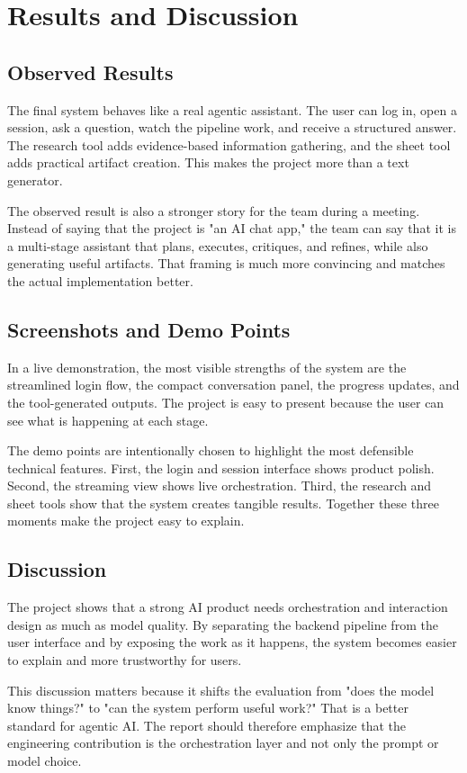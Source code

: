 \documentclass[11pt,oneside]{report}
\begin{document}
\chapter{Results and Discussion}
\section{Observed Results}
The final system behaves like a real agentic assistant. The user can log in, open a session, ask a question, watch the pipeline work, and receive a structured answer. The research tool adds evidence-based information gathering, and the sheet tool adds practical artifact creation. This makes the project more than a text generator.

The observed result is also a stronger story for the team during a meeting. Instead of saying that the project is "an AI chat app," the team can say that it is a multi-stage assistant that plans, executes, critiques, and refines, while also generating useful artifacts. That framing is much more convincing and matches the actual implementation better.

\section{Screenshots and Demo Points}
In a live demonstration, the most visible strengths of the system are the streamlined login flow, the compact conversation panel, the progress updates, and the tool-generated outputs. The project is easy to present because the user can see what is happening at each stage.

The demo points are intentionally chosen to highlight the most defensible technical features. First, the login and session interface shows product polish. Second, the streaming view shows live orchestration. Third, the research and sheet tools show that the system creates tangible results. Together these three moments make the project easy to explain.

\section{Discussion}
The project shows that a strong AI product needs orchestration and interaction design as much as model quality. By separating the backend pipeline from the user interface and by exposing the work as it happens, the system becomes easier to explain and more trustworthy for users.

This discussion matters because it shifts the evaluation from "does the model know things?" to "can the system perform useful work?" That is a better standard for agentic AI. The report should therefore emphasize that the engineering contribution is the orchestration layer and not only the prompt or model choice.
\end{document}
